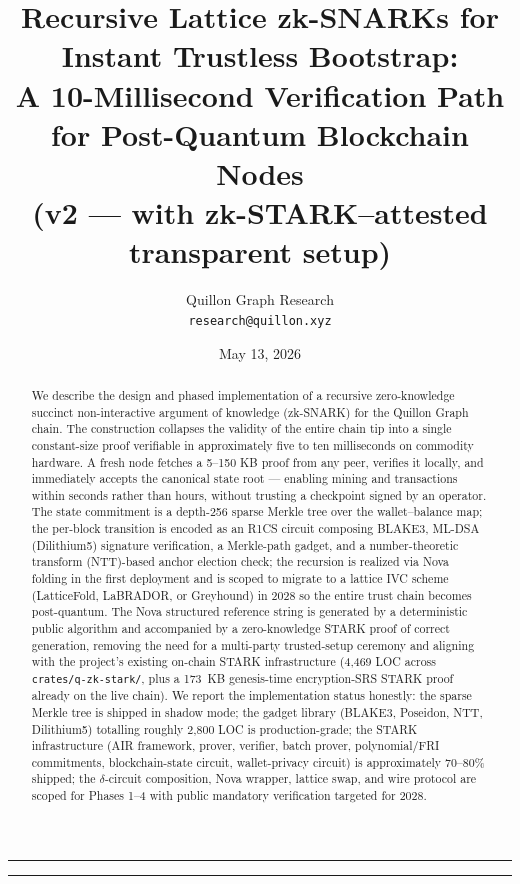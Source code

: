 \documentclass[11pt,a4paper]{article}
\title{Recursive Lattice zk-SNARKs for Instant Trustless Bootstrap:\\
       A 10-Millisecond Verification Path for Post-Quantum Blockchain Nodes\\
       \large{(v2 --- with zk-STARK--attested transparent setup)}}
\author{Quillon Graph Research\\
        \texttt{research@quillon.xyz}}
\date{May 13, 2026}
\begin{document}
\maketitle

\begin{abstract}
\noindent
We describe the design and phased implementation of a recursive zero-knowledge succinct
non-interactive argument of knowledge (zk-SNARK) for the Quillon Graph chain. The
construction collapses the validity of the entire chain tip into a single constant-size
proof verifiable in approximately five to ten milliseconds on commodity hardware.
A fresh node fetches a 5--150 KB proof from any peer, verifies it locally,
and immediately accepts the canonical state root --- enabling mining and transactions
within seconds rather than hours, without trusting a checkpoint signed by an operator.
The state commitment is a depth-256 sparse Merkle tree over the wallet--balance map;
the per-block transition is encoded as an R1CS circuit composing BLAKE3,
ML-DSA (Dilithium5) signature verification, a Merkle-path gadget, and a number-theoretic
transform (NTT)-based anchor election check; the recursion is realized via Nova
folding in the first deployment and is scoped to migrate to a lattice IVC scheme
(LatticeFold, LaBRADOR, or Greyhound) in 2028 so the entire trust chain becomes
post-quantum. The Nova structured reference string is generated by a deterministic
public algorithm and accompanied by a zero-knowledge STARK proof of correct generation,
removing the need for a multi-party trusted-setup ceremony and aligning with the
project's existing on-chain STARK infrastructure (4{,}469 LOC across
\texttt{crates/q-zk-stark/}, plus a 173~KB genesis-time encryption-SRS STARK proof
already on the live chain). We report the implementation status honestly: the
sparse Merkle tree is shipped in shadow mode; the gadget library (BLAKE3, Poseidon,
NTT, Dilithium5) totalling roughly 2{,}800 LOC is production-grade; the STARK
infrastructure (AIR framework, prover, verifier, batch prover, polynomial/FRI
commitments, blockchain-state circuit, wallet-privacy circuit) is approximately
70--80\% shipped; the $\delta$-circuit composition, Nova wrapper, lattice swap,
and wire protocol are scoped for Phases 1--4 with public mandatory verification
targeted for 2028.
\end{abstract}

\vspace{1em}
\noindent\rule{\linewidth}{0.4pt}
\tableofcontents
\noindent\rule{\linewidth}{0.4pt}
\vspace{0.5em}
\end{document}
